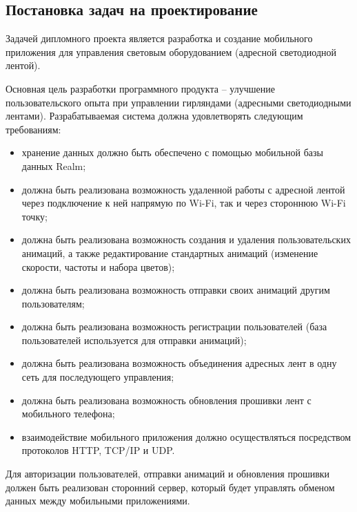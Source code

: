 \subsection{Постановка задач на проектирование}
\label{sec:develop:task}

Задачей дипломного проекта является разработка и создание мобильного приложения для управления световым оборудованием (адресной светодиодной лентой). 

Основная цель разработки программного продукта – улучшение пользовательского опыта при управлении гирляндами (адресными светодиодными лентами).
Разрабатываемая система должна удовлетворять следующим требованиям:
\begin{itemize}
	\item хранение данных должно быть обеспечено с помощью мобильной базы данных Realm;
	\item должна быть реализована возможность удаленной работы с адресной лентой через подключение к ней напрямую по Wi-Fi, так и через стороннюю Wi-Fi точку;
	\item должна быть реализована возможность создания и удаления пользовательских анимаций, а также редактирование стандартных анимаций (изменение скорости, частоты и набора цветов);
	\item должна быть реализована возможность отправки своих анимаций другим пользователям;
	\item должна быть реализована возможность регистрации пользователей (база пользователей используется для отправки анимаций);
	\item должна быть реализована возможность объединения адресных лент в одну сеть для последующего управления;
	\item должна быть реализована возможность обновления прошивки лент с мобильного телефона;
	\item взаимодействие мобильного приложения должно осуществляться посредством протоколов HTTP, TCP/IP и UDP.
\end{itemize}

Для авторизации пользователей, отправки анимаций и обновления прошивки должен быть реализован сторонний сервер, который будет управлять обменом данных между мобильными приложениями.
